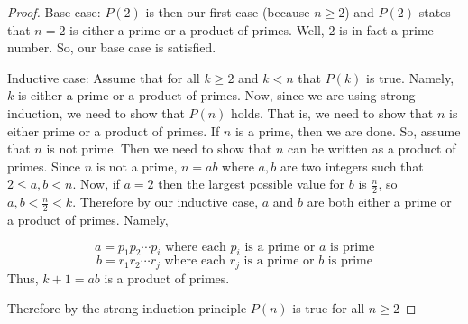 \begin{questions}
\begin{solution}
\begin{proof}
Base case: $P(2)$ is then our first case (because $n\geq 2$) and $P(2)$ states that $n=2$ is either a prime or a product of primes. Well, $2$ is in fact a prime number. So, our base case is satisfied.

Inductive case: Assume that for all $k\geq 2$ and $k<n$ that $P(k)$ is true. Namely, $k$ is either a prime or a product of primes. Now, since we are using strong induction, we need to show that $P(n)$ holds. That is, we need to show that $n$ is either prime or a product of primes. If $n$ is a prime, then we are done. So, assume that $n$ is not prime. Then we need to show that $n$ can be written as a product of primes. Since $n$ is not a prime, $n=ab$ where $a,b$ are two integers such that $2 \leq a, b<n$. Now, if $a=2$ then the largest possible value for $b$ is $\frac{n}{2}$, so $a,b< \frac{n}{2} <k$. Therefore by our inductive case, $a$ and $b$ are both either a prime or a product of primes. Namely,

\[a=p_1p_2\cdots p_i \text{ where each $p_i$ is a prime or } a \text{ is prime} \] 
\[b=r_1r_2\cdots r_j \text{ where each $r_j$ is a prime or } b \text{ is prime}\]
Thus, $k+1=ab$ is a product of primes.

Therefore by the strong induction principle $P(n)$ is true for all $n\geq 2$
 \end{proof}
 \end{solution}
 
 

 
\end{questions}


